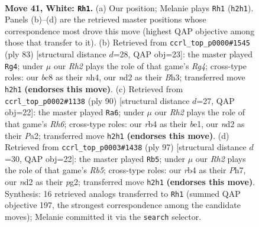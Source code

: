 \documentclass[11pt]{article}
\begin{document}
\clearpage

\begin{figure}[p]\centering
\begin{subfigure}{0.46\textwidth}\centering
\resizebox{\linewidth}{!}{%
\newchessgame
\chessboard[
  setfen={r1b3k1/8/8/8/1r5p/7P/p2n2PR/K7 w - - 0 41},
  showmover=false,
  pgfstyle=straightmove, color=movearrow, markmove={h2-h1}
]}
\caption{}
\end{subfigure}\hfill
\begin{subfigure}{0.46\textwidth}\centering
\resizebox{\linewidth}{!}{%
\newchessgame
\chessboard[
  setfen={8/5k2/5P2/p5r1/1p3R1N/1P5b/2PK4/8 b - - 2 42},
  showmover=false,
  pgfstyle=straightmove, color=movearrow, markmove={g5-g4}
]}
\caption{}
\end{subfigure}
\\[4pt]
\begin{subfigure}{0.46\textwidth}\centering
\resizebox{\linewidth}{!}{%
\newchessgame
\chessboard[
  setfen={8/3k4/7R/p3rp2/K1B5/7P/P5P1/4b3 w - - 10 46},
  showmover=false,
  pgfstyle=straightmove, color=movearrow, markmove={h6-a6}
]}
\caption{}
\end{subfigure}\hfill
\begin{subfigure}{0.46\textwidth}\centering
\resizebox{\linewidth}{!}{%
\newchessgame
\chessboard[
  setfen={8/1p5p/p6k/P3R2P/1r6/6K1/6P1/8 b - - 2 49},
  showmover=false,
  pgfstyle=straightmove, color=movearrow, markmove={b4-b5}
]}
\caption{}
\end{subfigure}
\caption{\textbf{Move 41, White: \texttt{Rh1}.} (a) Our position; Melanie plays \texttt{Rh1} (\texttt{h2h1}). Panels (b)--(d) are the retrieved master positions whose correspondence most drove this move (highest QAP objective among those that transfer to it). (b) Retrieved from \texttt{ccrl\_top\_p0000\#1545} (ply 83) [structural distance $d$=28, QAP obj=23]: the master played \texttt{Rg4}; under $\mu$ our \emph{Rh2} plays the role of that game's \emph{Rg4}; cross-type roles: our \emph{b}c8 as their \emph{n}h4, our \emph{n}d2 as their \emph{B}h3; transferred move \texttt{h2h1} \textbf{(endorses this move)}. (c) Retrieved from \texttt{ccrl\_top\_p0002\#1138} (ply 90) [structural distance $d$=27, QAP obj=22]: the master played \texttt{Ra6}; under $\mu$ our \emph{Rh2} plays the role of that game's \emph{Rh6}; cross-type roles: our \emph{r}b4 as their \emph{b}e1, our \emph{n}d2 as their \emph{P}a2; transferred move \texttt{h2h1} \textbf{(endorses this move)}. (d) Retrieved from \texttt{ccrl\_top\_p0003\#1438} (ply 97) [structural distance $d$=30, QAP obj=22]: the master played \texttt{Rb5}; under $\mu$ our \emph{Rh2} plays the role of that game's \emph{Rb5}; cross-type roles: our \emph{r}b4 as their \emph{P}h7, our \emph{n}d2 as their \emph{p}g2; transferred move \texttt{h2h1} \textbf{(endorses this move)}. Synthesis: 16 retrieved analogs transferred to \texttt{Rh1} (summed QAP objective 197, the strongest correspondence among the candidate moves); Melanie committed it via the \texttt{search} selector.}
\label{fig:thought-m80}
\end{figure}
\end{document}
